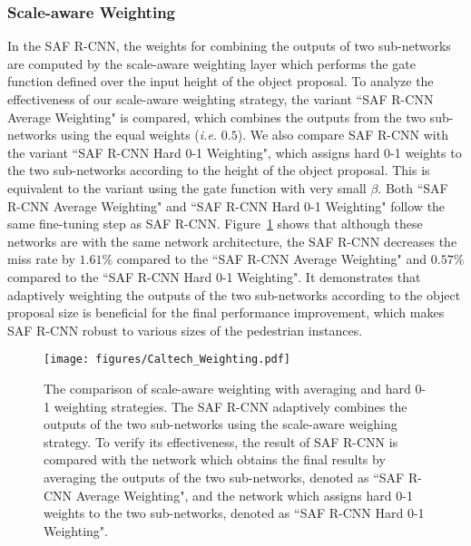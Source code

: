 \documentclass[journal]{IEEEtran}
\begin{document}
\subsubsection{Scale-aware Weighting}
In the SAF R-CNN, the weights for combining the outputs of two sub-networks are computed by the scale-aware weighting layer which performs the gate function defined over the input height of the object proposal. To analyze the effectiveness of our scale-aware weighting strategy, the variant ``SAF R-CNN Average Weighting" is compared, which combines the outputs from the two sub-networks using the equal weights (\emph{i.e.} $0.5$). We also compare SAF R-CNN with the variant ``SAF R-CNN Hard 0-1 Weighting", which assigns hard 0-1 weights to the two sub-networks according to the height of the object proposal. This is equivalent to the variant using the gate function with very small $\beta$. Both ``SAF R-CNN Average Weighting" and ``SAF R-CNN Hard 0-1 Weighting" follow the same fine-tuning step as SAF R-CNN. Figure~\ref{fig:Caltech_Weighting} shows that although these networks are with the same network architecture, the SAF R-CNN decreases the miss rate by $1.61\%$ compared to the ``SAF R-CNN Average Weighting" and $0.57\%$ compared to the ``SAF R-CNN Hard 0-1 Weighting". It demonstrates that adaptively weighting the outputs of the two sub-networks according to the object proposal size is beneficial for the final performance improvement, which makes SAF R-CNN robust to various sizes of the pedestrian instances.



\begin{figure}
	\begin{center}
		\texttt{[image: figures/Caltech\_Weighting.pdf]}
		\caption{{The comparison of scale-aware weighting with averaging and hard 0-1 weighting strategies. The SAF R-CNN adaptively combines the outputs of the two sub-networks using the scale-aware weighing strategy. To verify its effectiveness, the result of SAF R-CNN is compared with the network which obtains the final results by averaging the outputs of the two sub-networks, denoted as ``SAF R-CNN Average Weighting", and the network which assigns hard 0-1 weights to the two sub-networks, denoted as ``SAF R-CNN Hard 0-1 Weighting".}}	
		\label{fig:Caltech_Weighting}
	\end{center}
	\vspace{-4mm}
\end{figure}
\end{document}
